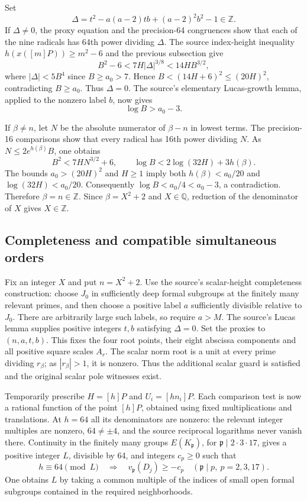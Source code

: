 Set
\[
 \Delta=t^2-a(a-2)tb+(a-2)^2b^2-1\in\mathbb Z.
\]
If $\Delta\ne0$, the proxy equation and the precision-64 congruences
show that each of the nine radicals has 64th power dividing $\Delta$.
The source index-height inequality $h(x([m]P))\ge m^2-6$ and the
previous subsection give
\[
 B^2-6<7H|\Delta|^{3/8}<14HB^{3/2},
\]
where $|\Delta|<5B^4$ since $B\ge a_0>7$. Hence
$B<(14H+6)^2\le(20H)^2$, contradicting $B\ge a_0$.
Thus $\Delta=0$. The source's elementary Lucas-growth lemma, applied
to the nonzero label $b$, now gives
\[
 \log B>a_0-3.
\]

If $\beta\ne n$, let $N$ be the absolute numerator of $\beta-n$ in
lowest terms. The precision-16 comparisons show that every radical
has 16th power dividing $N$. As $N\le2e^{h(\beta)}B$, one obtains
\[
 B^2<7HN^{3/2}+6,
 \qquad \log B<2\log(32H)+3h(\beta).
\]
The bounds $a_0>(20H)^2$ and $H\ge1$ imply both
$h(\beta)<a_0/20$ and $\log(32H)<a_0/20$. Consequently
$\log B<a_0/4<a_0-3$, a contradiction. Therefore $\beta=n\in\mathbb Z$.
Since $\beta=X^2+2$ and $X\in\mathbb Q$, reduction of the denominator
of $X$ gives $X\in\mathbb Z$.

\subsection{Completeness and compatible simultaneous orders}

Fix an integer $X$ and put $n=X^2+2$. Use the source's scalar-height
completeness construction: choose $J_0$ in sufficiently deep formal
subgroups at the finitely many relevant primes, and then choose a
positive label $a$ sufficiently divisible relative to $J_0$. There
are arbitrarily large such labels, so require $a>M$. The source's
Lucas lemma supplies positive integers $t,b$ satisfying $\Delta=0$.
Set the proxies to $(n,a,t,b)$. This fixes the four root points, their
eight abscissa components and all positive square scales $A_r$.
The scalar norm root is a unit at every prime dividing $r_\beta$;
as $|r_\beta|>1$, it is nonzero. Thus the additional scalar guard
is satisfied and the original scalar pole witnesses exist.

Temporarily prescribe $H=[h]P$ and $U_i=[hn_i]P$. Each comparison
test is now a rational function of the point $[h]P$, obtained using
fixed multiplications and translations. At $h=64$ all its denominators
are nonzero: the relevant integer multiples are nonzero, $64\ne\pm4$,
and the source reciprocal logarithms never vanish there. Continuity
in the finitely many groups $E(K_{\mathfrak p})$, for
$\mathfrak p\mid2\cdot3\cdot17$, gives a positive integer $L$,
divisible by 64, and integers $c_p\ge0$ such that
\[
 h\equiv64\pmod L
 \quad\Longrightarrow\quad
 v_{\mathfrak p}(D_j)\ge-c_p
 \quad(\mathfrak p\mid p,\ p=2,3,17).
\]
One obtains $L$ by taking a common multiple of the indices of small
open formal subgroups contained in the required neighborhoods.

